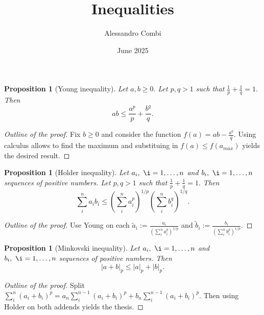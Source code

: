 \documentclass{article}
\title{Inequalities}
\author{Alessandro Combi}
\date{June 2025}
\newtheorem{proposition}[theorem]{Proposition}
\begin{document}
\maketitle
\tableofcontents
\clearpage

\begin{proposition}[Young inequality]
    Let $a,b \geq 0.$ Let $p, q > 1$ such that $\frac{1}{p} + \frac{1}{q} = 1.$ 
    Then
    \begin{equation}
        ab \leq \frac{a^p}{p} + \frac{b^q}{q}.
    \end{equation}
\end{proposition}
\begin{proof}[Outline of the proof]
    Fix $b \geq 0$ and consider the function $f(a) = ab - \frac{a^q}{q}.$
    Using calculus allows to find the maximum and substituing in $f(a) \leq f(a_{max})$ yields the desired result.
\end{proof}

\begin{proposition}[Holder inequality]
    Let $a_i,\ \i = 1,\ldots, n$ and $b_i,\ \i = 1,\ldots, n$ sequences of positive numbers. Let $p, q > 1$ such that $\frac{1}{p} + \frac{1}{q} = 1.$ 
    Then
    \begin{equation}
        \sum_i^n a_i b_i \leq \left( \sum_i^n a_i^p \right)^{1/p} \left( \sum_i^n b_i^q \right)^{1/q}.
    \end{equation}
\end{proposition}
\begin{proof}[Outline of the proof]
    Use Young on each $\tilde{a}_i := \frac{a_i}{\left( \sum_i^n a_i^p \right)^{1/p}}$ and $\tilde{b}_i := \frac{b_i}{\left( \sum_i^n b_i^p \right)^{1/p}}$. 
\end{proof}

\begin{proposition}[Minkovski inequality]
    Let $a_i,\ \i = 1,\ldots, n$ and $b_i,\ \i = 1,\ldots, n$ sequences of positive numbers. 
    Then 
    \begin{equation}
        | a + b |_p \leq |a|_p + |b|_p.
    \end{equation}
\end{proposition}
\begin{proof}[Outline of the proof]
    Split $\sum_i^n (a_i + b_i)^p = a_n \sum_i^{n-1} (a_i + b_i)^p + b_n \sum_i^{n-1} (a_i + b_i)^p.$
    Then using Holder on both addends yields the thesis.
\end{proof}
\end{document}

